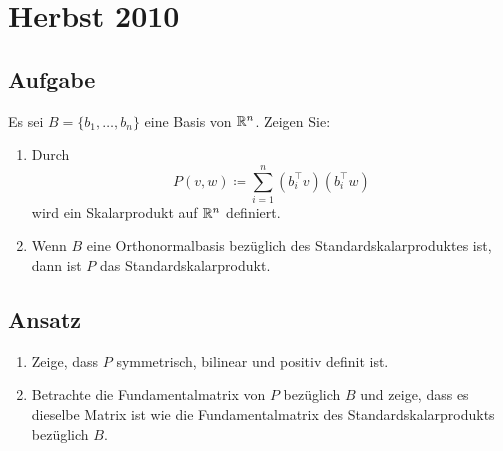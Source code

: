 \newpage

\section{Herbst 2010}

\subsection{Aufgabe}
Es sei \( B = \{ b_1, \dots, b_n \} \) eine Basis von \( \mathbb{R}^n \). Zeigen Sie:
\begin{enumerate}
	\item Durch
		\begin{equation*}
		 	P(v,w) \coloneqq \sum_{i=1}^n (b_i^\top v)(b_i^\top w)
		 \end{equation*} 
		 wird ein Skalarprodukt auf \( \mathbb{R}^n \) definiert.
	\item Wenn \( B \) eine Orthonormalbasis bezüglich des Standardskalarproduktes ist, dann ist \( P \) das Standardskalarprodukt.
\end{enumerate}

\subsection{Ansatz}
\begin{enumerate}
	\item Zeige, dass \( P \) symmetrisch, bilinear und positiv definit ist.
	\item Betrachte die Fundamentalmatrix von \( P \) bezüglich \( B \) und zeige, dass es dieselbe Matrix ist wie die Fundamentalmatrix des Standardskalarprodukts bezüglich \( B \). 
\end{enumerate}


